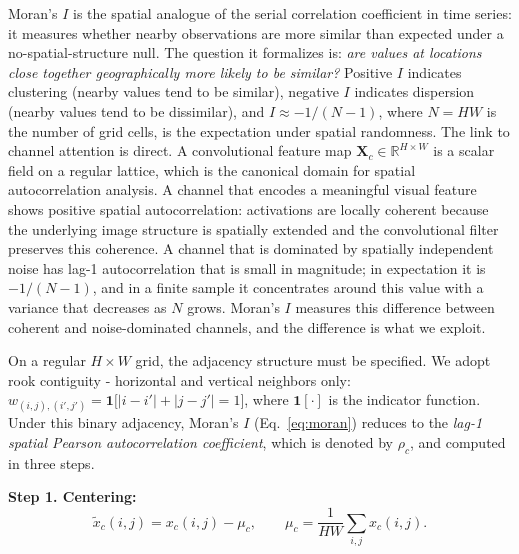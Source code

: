 \documentclass{bmvc2k}
\begin{document}
Moran's $I$ is the spatial analogue of the serial correlation coefficient in time series: it measures whether nearby observations are more similar than expected under a no-spatial-structure null. The question it formalizes is: \textit{are values at locations close together geographically more likely to be similar?} Positive $I$ indicates clustering (nearby values tend to be similar), negative $I$ indicates dispersion (nearby values tend to be dissimilar), and $I \approx -1/(N-1)$, where $N=HW$ is the number of grid cells, is the expectation under spatial randomness. The link to channel attention is direct. A convolutional feature map $\mathbf{X}_c \in \mathbb{R}^{H \times W}$ is a scalar field on a regular lattice, which is the canonical domain for spatial autocorrelation analysis. A channel that encodes a meaningful visual feature shows positive spatial autocorrelation: activations are
locally coherent because the underlying image structure is spatially extended and the convolutional filter preserves this coherence. A channel that is dominated by spatially independent noise has lag-1 autocorrelation that is small in magnitude; in expectation it is
$-1/(N-1)$, and in a finite sample it concentrates around this value with a variance that decreases as $N$ grows. Moran's $I$ measures this difference between coherent and noise-dominated channels, and the difference is what we exploit.


On a regular $H \times W$ grid, the adjacency structure must be specified. We adopt rook contiguity - horizontal and vertical neighbors only: $w_{(i,j),(i',j')} = \mathbf{1}\!\big[|i-i'| + |j-j'| = 1\big]$, where $\mathbf{1}[\cdot]$ is the indicator function. Under this binary adjacency, Moran's $I$ (Eq.~\ref{eq:moran}) reduces to the \textit{lag-1 spatial Pearson autocorrelation coefficient}, which is denoted by $\rho_c$, and computed in three steps.


\smallskip\noindent\textbf{Step 1. Centering:}
\begin{equation}\label{eq:center}
    \tilde{x}_c(i,j) = x_c(i,j) - \mu_c, \qquad \mu_c = \frac{1}{HW}\sum_{i,j} x_c(i,j).
\end{equation}

\end{document}
